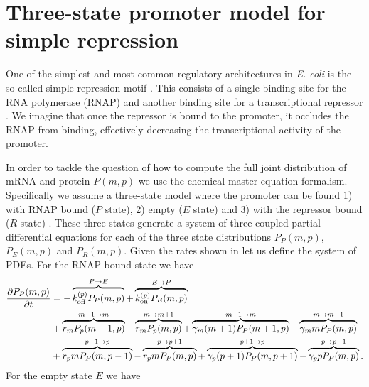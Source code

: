 \section{Three-state promoter model for simple repression}

One of the simplest and most common regulatory architectures in \textit{E. coli}
is the so-called simple repression motif \cite{Rydenfelt2014}. This consists of
a single binding site for the RNA polymerase (RNAP) and another binding site for
a transcriptional repressor . We imagine that once the
repressor is bound to the promoter, it occludes the RNAP from binding,
effectively decreasing the transcriptional activity of the promoter.

In order to tackle the question of how to compute the full joint distribution of
mRNA and protein $P(m, p)$ we use the chemical master equation formalism.
Specifically we assume a three-state model where the promoter can be found 1)
with RNAP bound ($P$ state), 2) empty ($E$ state) and 3) with the repressor
bound ($R$ state) . These three states generate a system of
three coupled partial differential equations for each of the three state
distributions $P_P(m, p)$, $P_E(m, p)$ and $P_R(m, p)$. Given the rates shown in
 let us define the system of PDEs. For the RNAP bound state we have
\begin{equation}
  \begin{aligned}
    \dt{P_P(m, p)} &=
    - \overbrace{\kpoff P_P(m, p)}^{P \rightarrow E} %
    + \overbrace{\kpon P_E(m, p)}^{E \rightarrow P}\\ %
    &+ \overbrace{r_m P_p(m-1, p)}^{m-1 \rightarrow m} %
    - \overbrace{r_m P_p(m, p)}^{m \rightarrow m+1}%
    + \overbrace{\gm (m + 1) P_P(m+1 , p)}^{m+1 \rightarrow m} %
    - \overbrace{\gm m P_P(m , p)}^{m \rightarrow m-1}\\ %
    &+ \overbrace{r_p m P_P(m, p - 1)}^{p-1 \rightarrow p} %
    - \overbrace{r_p m P_P(m, p)}^{p \rightarrow p+1} %
    + \overbrace{\gp (p + 1) P_P(m, p + 1)}^{p + 1 \rightarrow p} %
    - \overbrace{\gp p P_P(m, p)}^{p \rightarrow p-1}. %
  \end{aligned}
\end{equation}
For the empty state $E$ we have
